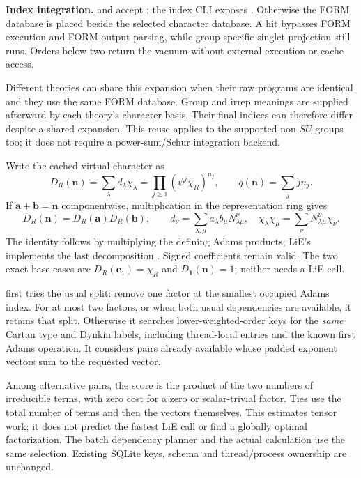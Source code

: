 \textbf{Index integration.}  and
 accept ; the
index CLI exposes . Otherwise the FORM database is
placed beside the selected character database. A hit bypasses FORM execution
and FORM-output parsing, while group-specific singlet projection still runs.
Orders below two return the vacuum without external execution or cache access.

Different theories can share this expansion when their raw programs are
identical and they use the same FORM database. Group and irrep meanings are
supplied afterward by each theory's character basis. Their final indices can
therefore differ despite a shared expansion. This reuse applies to the supported
non-$SU$ groups too; it does not require a power-sum/Schur integration backend.

\clearpage
{}
Write the cached virtual character as
\[
 D_R(\mathbf n)=\sum_\lambda d_\lambda\chi_\lambda
   =\prod_{j\geq1}(\psi^j\chi_R)^{n_j},\qquad
 q(\mathbf n)=\sum_j j n_j.
\]
If $\mathbf a+\mathbf b=\mathbf n$ componentwise, multiplication in the
representation ring gives
\[
 D_R(\mathbf n)=D_R(\mathbf a)D_R(\mathbf b),\qquad
 d_\nu=\sum_{\lambda,\mu}
     a_\lambda b_\mu N_{\lambda\mu}^{\nu},
 \quad \chi_\lambda\chi_\mu=\sum_\nu N_{\lambda\mu}^{\nu}\chi_\nu.
\]
The identity follows by multiplying the defining Adams products; LiE's
 implements the last decomposition \cite[Sec.~4.5]{lie}.
Signed coefficients remain valid. The two exact base cases are
$D_R(\mathbf e_1)=\chi_R$ and $D_{\mathbf1}(\mathbf n)=1$;
neither needs a LiE call.

 first tries the
usual split: remove one factor at the smallest occupied Adams index. For at most
two factors, or when both usual dependencies are available, it retains that
split. Otherwise it searches lower-weighted-order keys for the \emph{same}
Cartan type and Dynkin labels, including thread-local entries and the known
first Adams operation. It considers pairs already available whose padded
exponent vectors sum to the requested vector.

Among alternative pairs, the score is the product of the two numbers of
irreducible terms, with zero cost for a zero or scalar-trivial factor. Ties use
the total number of terms and then the vectors themselves. This estimates
tensor work; it does not predict the fastest LiE call or find a globally optimal
factorization. The batch dependency planner and the actual calculation use the
same selection. Existing SQLite keys, schema and thread/process ownership are
unchanged.

